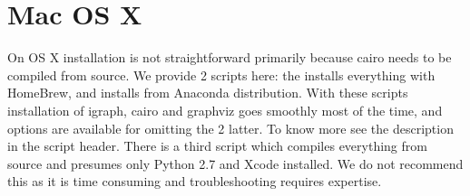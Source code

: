 \documentclass[letterpaper,10pt,english]{sphinxmanual}
\begin{document}
\section{Mac OS X}
\label{\detokenize{installation:mac-os-x}}
On OS X installation is not straightforward primarily because cairo needs to
be compiled from source. We provide 2 scripts here: the
 installs everything with HomeBrew, and
 installs from Anaconda distribution. With these
scripts installation of igraph, cairo and graphviz goes smoothly most of the
time, and options are available for omitting the 2 latter. To know more see
the description in the script header. There is a third script
 which compiles everything from source and presumes
only Python 2.7 and Xcode installed. We do not recommend this as it is time
consuming and troubleshooting requires expertise.
\end{document}
